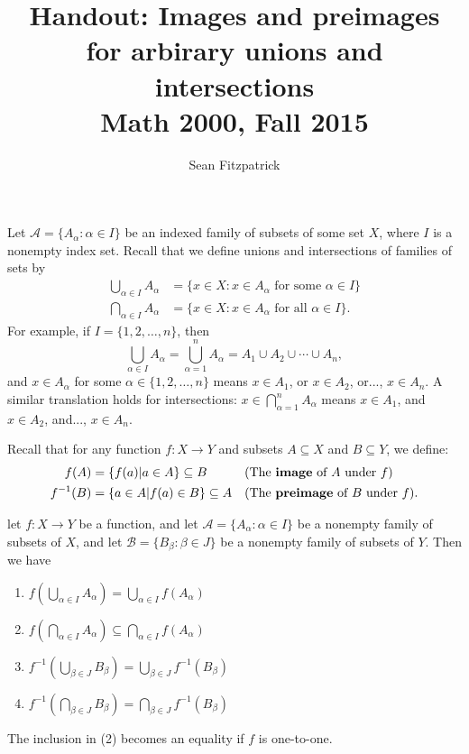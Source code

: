 \documentclass[letterpaper,12pt]{article}
\title{Handout: Images and preimages for arbirary unions and intersections\\Math 2000, Fall 2015}
\author{Sean Fitzpatrick}
\newcommand{\A}{\mathcal{A}}
\newcommand{\B}{\mathcal{B}}
\newcommand{\di}{\displaystyle}
\begin{document}
\maketitle

Let $\A = \{A_\alpha : \alpha\in I\}$ be an indexed family of subsets of some set $X$, where $I$ is a nonempty index set. Recall that we define unions and intersections of families of sets by
\begin{align*}
 \bigcup_{\alpha\in I}A_\alpha &= \{x\in X : x\in A_{\alpha} \text{ for some } \alpha\in I\}\\
 \bigcap_{\alpha\in I}A_\alpha &= \{x\in X : x\in A_{\alpha} \text{ for all } \alpha\in I\}.
\end{align*}
For example, if $I = \{1,2,\ldots, n\}$, then
\[
 \bigcup_{\alpha\in I}A_\alpha = \bigcup_{\alpha=1}^nA_\alpha = A_1\cup A_2\cup \cdots\cup A_n,
\]
and $x\in A_\alpha$ for some $\alpha\in\{1,2,\ldots, n\}$ means $x\in A_1$, or $x\in A_2$, or..., $x\in A_n$. A similar translation holds for intersections: $x\in \bigcap_{\alpha=1}^nA_\alpha$ means $x\in A_1$, and $x\in A_2$, and..., $x\in A_n$.

Recall that for any function $f:X\to Y$ and subsets $A\subseteq X$ and $B\subseteq Y$, we define:
\begin{align*}
 f(A) &= \{f(a) | a\in A\}\subseteq B & &\text{(The \textbf{image} of $A$ under $f$)}\\
 f^{-1}(B) &= \{a\in A | f(a)\in B\} \subseteq A & & \text{(The \textbf{preimage} of $B$ under $f$).}
\end{align*}

 let $f:X\to Y$ be a function, and let $\A = \{A_\alpha : \alpha\in I\}$ be a nonempty family of subsets of $X$, and let $\B=\{B_\beta : \beta\in J\}$ be a nonempty family of subsets of $Y$. Then we have
\begin{multicols}{2}
\begin{enumerate}
 \item $\di f\left(\bigcup_{\alpha\in I}A_\alpha\right) = \bigcup_{\alpha\in I}f(A_\alpha)$
 \item $\di f\left(\bigcap_{\alpha\in I}A_\alpha\right) \subseteq \bigcap_{\alpha\in I}f(A_\alpha)$
 \item $\di f^{-1}\left(\bigcup_{\beta\in J}B_\beta\right) = \bigcup_{\beta\in J}f^{-1}(B_\beta)$
 \item $\di f^{-1}\left(\bigcap_{\beta\in J}B_\beta\right) = \bigcap_{\beta\in J}f^{-1}(B_\beta)$
\end{enumerate}
\end{multicols}
The inclusion in (2) becomes an equality if $f$ is one-to-one. 
\pagebreak
\end{document}

